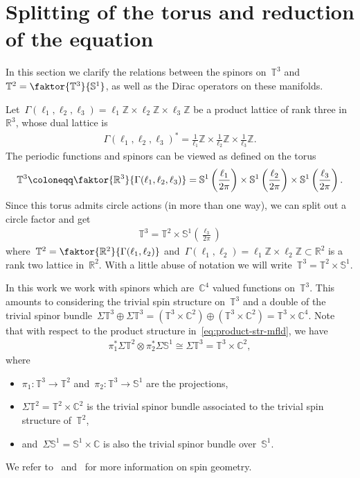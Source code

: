 \documentclass[11pt,final]{amsart}
\newcommand{\R}{\mathbb{R}}
\newcommand{\C}{\mathbb{C}}
\newcommand{\T}{\mathbb{T}}
\newcommand{\sph}{\mathbb{S}}
\newcommand{\parenthesis}[1]{\left(#1\right)} %
\newcommand{\bZ}{\mathbb{Z}}
\begin{document}
\section{Splitting of the torus and reduction of the equation}\label{sect:splitting}

In this section we clarify the relations between the spinors on~$\T^3$ and~$\T^2=\faktor{\T^3}{\sph^1}$, as well as the Dirac operators on these manifolds. 

Let~$\Gamma(\ell_1,\ell_2,\ell_3)=\ell_1\mathbb{Z} \times \ell_2\mathbb{Z} \times \ell_3\mathbb{Z}$ be a product lattice of rank three in~$\R^3$, whose dual lattice is 
\begin{align}
    \Gamma(\ell_1,\ell_2,\ell_3)^*=\frac{1}{\ell_1}\bZ\times \frac{1}{\ell_2}\bZ \times \frac{1}{\ell_3}\bZ.
\end{align}
The periodic functions and spinors can be viewed as defined on the torus
\begin{align}
    \T^3\coloneqq \faktor{\R^3}{\Gamma(\ell_1,\ell_2,\ell_3)} 
    = \sph^1\parenthesis{\frac{\ell_1}{2\pi}} 
    \times \sph^1\parenthesis{\frac{\ell_2}{2\pi}}
    \times \sph^1\parenthesis{\frac{\ell_3}{2\pi}}.
\end{align}
Since this torus admits circle actions (in more than one way), we can split out a circle factor and get 
\begin{align}\label{eq:product-str-mfld}
    \T^3= \T^2\times \sph^1(\frac{\ell_3}{2\pi})
\end{align}
where~$\T^2=\faktor{\R^2}{\Gamma(\ell_1,\ell_2)}$ and~$\Gamma(\ell_1,\ell_2)=\ell_1\bZ\times \ell_2\bZ\subset \R^2$ is a rank two lattice in~$\R^2$.
With a little abuse of notation we will write~$\T^3=\T^2\times\sph^1$. 

In this work we work with spinors which are~$\C^4$ valued functions on~$\T^3$.
This amounts to considering the trivial spin structure on~$\T^3$ and a double of the trivial spinor bundle~$\Sigma \T^3 \oplus\Sigma \T^3=(\T^3\times \C^2)\oplus (\T^3\times\C^2)=\T^3\times \C^4$.
Note that with respect to the product structure in~\eqref{eq:product-str-mfld}, we have
\begin{align}\label{eq:splitting-spinor-bundles}
    \pi_1^*\Sigma\T^2\otimes\pi_2^*\Sigma\sph^1\cong\Sigma\T^3=\T^3\times\C^2,
\end{align}
where
\begin{itemize}
    \item $\pi_1\colon\T^3\to\T^2$ and~$\pi_2\colon\T^3\to\sph^1$ are the projections,
    \item $\Sigma\T^2=\T^2\times \C^2$ is the trivial spinor bundle associated to the trivial spin structure of~$\T^2$,
    \item and~$\Sigma\sph^1=\sph^1\times\C$ is also the trivial spinor bundle over~$\sph^1$.
\end{itemize}
We refer to~\cite{Ginoux2009Dirac} and~\cite{Lawson1989Spin} for more information on spin geometry. 
\end{document}
